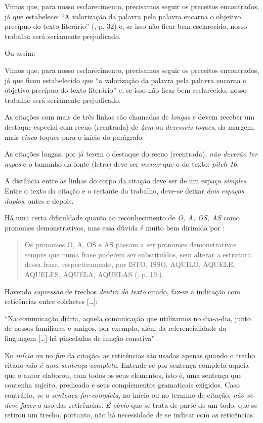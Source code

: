 Vimos que, para nosso esclarecimento, precisamos seguir os preceitos encontrados, já que  estabelece: ``A valorização da palavra pela palavra encarna o objetivo precípuo do texto literário'' (\citeyear{guimaraes1985}, p. 32) e, se isso não ficar bem esclarecido, nosso trabalho será seriamente prejudicado.

Ou assim:

Vimos que, para nosso esclarecimento, precisamos seguir os preceitos encontrados, já que ficou estabelecido que ``a valorização da palavra pela palavra encarna o objetivo precípuo do texto literário'' \cite[p. 32]{guimaraes1985} e, se isso não ficar bem esclarecido, nosso trabalho será seriamente prejudicado.

As citações com mais de três linhas são chamadas de \emph{longas} e devem receber um destaque especial com recuo (reentrada) de \emph{4cm} ou \emph{dezesseis toques}, da margem, mais \emph{cinco} toques para o início do parágrafo.

As citações longas, por já terem o destaque do recuo (reentrada), \emph{não deverão ter aspas} e o tamanho da fonte (letra) deve ser \emph{menor} que o do texto: \emph{pitch 10}.

A distância entre as linhas do corpo da citação deve ser de um espaço \emph{simples}. Entre o texto da citação e o restante do trabalho, deve-se deixar \emph{dois espaços duplos}, antes e depois.

Há uma certa dificuldade quanto ao reconhecimento de \emph{O, A, OS, AS} como pronomes demonstrativos, mas essa dúvida é muito bem dirimida por \citeyear{fernandes1994}:

\begin{quote}Os pronomes O, A, OS e AS passam a ser pronomes demonstrativos sempre que numa frase puderem ser substituídos, sem alterar a estrutura dessa frase, respectivamente, por ISTO, ISSO, AQUILO, AQUELE, AQUELES, AQUELA, AQUELAS (\citeyear{fernandes1994}, p. 19.).\end{quote}

Havendo \emph{supressão} de trechos \emph{dentro do texto} citado, faz-se a indicação com reticências entre colchetes [\ldots]:

``Na comunicação diária, aquela comunicação que utilizamos no dia-a-dia, junto de nossos familiares e amigos, por exemplo, além da referencialidade da linguagem [\ldots] há pinceladas de função conativa'' \cite[p. 37]{chalhub1991}.

No \emph{início} ou no \emph{fim} da citação, as reticências são usadas apenas quando o trecho citado \emph{não é uma sentença completa}. Entende-se por sentença completa aquela que o autor elaborou, com todos os seus elementos, isto é, uma sentença que contenha sujeito, predicado e seus complementos gramaticais exigidos. Caso contrário, \emph{se a sentença for completa}, no início ou no termino de citação, \emph{não se deve fazer} o uso das reticências. \emph{É óbvio} que se trata de parte de um todo, que se retirou um trecho, portanto, não há necessidade de se indicar com as reticências.

